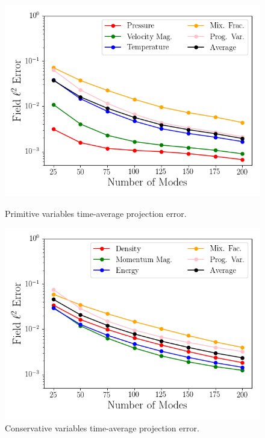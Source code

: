 \begin{figure}
	\begin{minipage}{0.48\linewidth}
		\includegraphics[width=0.99\linewidth,trim={0.5em 0.5em 0.5em 0.5em},clip]{Chapters/CavityAndCVRC/Images/cvrc/projection_error_primitive.png}
		\caption{\label{fig:cvrcProjErrPrim}Primitive variables time-average projection error.}
	\end{minipage} \hspace{0.5em}
	\begin{minipage}{0.48\linewidth}
		\includegraphics[width=0.99\linewidth,trim={0.5em 0.5em 0.5em 0.5em},clip]{Chapters/CavityAndCVRC/Images/cvrc/projection_error_conservative.png}
		\caption{\label{fig:cvrcProjErrCons}Conservative variables time-average projection error.}
	\end{minipage}
\end{figure}

